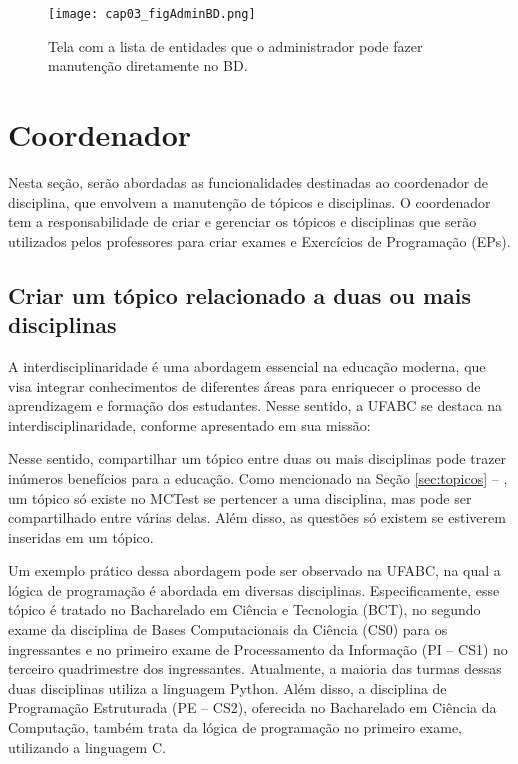 \begin{figure}[!ht]
  \centering
  \texttt{[image: cap03\_figAdminBD.png]}
  \caption{Tela com a lista de entidades que o administrador pode fazer manutenção diretamente no BD.}
  \label{fig:cap03_figAdminBD}
\end{figure}


\section{Coordenador}

Nesta seção, serão abordadas as funcionalidades destinadas ao coordenador de disciplina, que envolvem a manutenção de tópicos e disciplinas. O coordenador tem a responsabilidade de criar e gerenciar os tópicos e disciplinas que serão utilizados pelos professores para criar exames e Exercícios de Programação (EPs).

\subsection{Criar um tópico relacionado a duas ou mais disciplinas}

A interdisciplinaridade é uma abordagem essencial na educação moderna, que visa integrar conhecimentos de diferentes áreas para enriquecer o processo de aprendizagem e formação dos estudantes. Nesse sentido, a UFABC se destaca na interdisciplinaridade, conforme apresentado em sua missão:


Nesse sentido, compartilhar um tópico entre duas ou mais disciplinas pode trazer inúmeros benefícios para a educação. Como mencionado na Seção \ref{sec:topicos} -- , um tópico só existe no MCTest se pertencer a uma disciplina, mas pode ser compartilhado entre várias delas. Além disso, as questões só existem se estiverem inseridas em um tópico. 

Um exemplo prático dessa abordagem pode ser observado na UFABC, na qual a lógica de programação é abordada em diversas disciplinas. Especificamente, esse tópico é tratado no Bacharelado em Ciência e Tecnologia (BCT), no segundo exame da disciplina de Bases Computacionais da Ciência (CS0) para os ingressantes e no primeiro exame de Processamento da Informação (PI -- CS1) no terceiro quadrimestre dos ingressantes. Atualmente, a maioria das turmas dessas duas disciplinas utiliza a linguagem Python. Além disso, a disciplina de Programação Estruturada (PE -- CS2), oferecida no Bacharelado em Ciência da Computação, também trata da lógica de programação no primeiro exame, utilizando a linguagem C.

